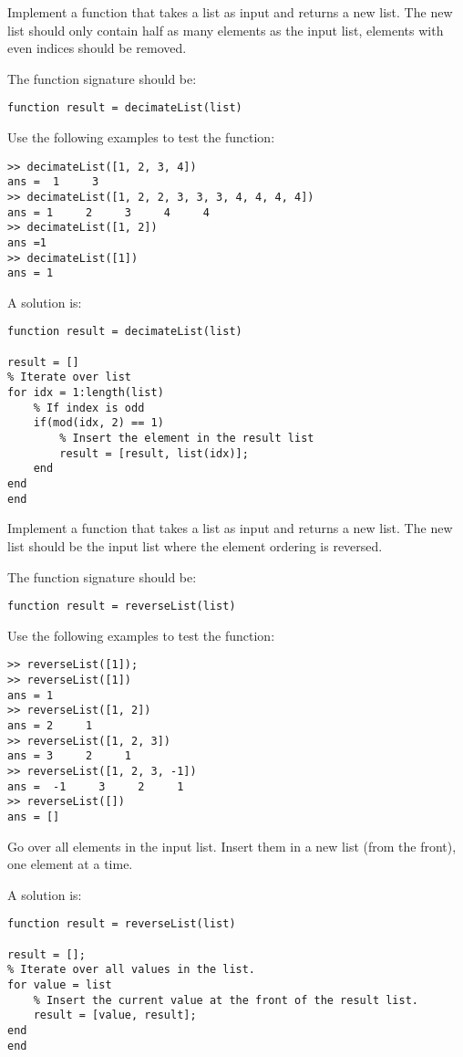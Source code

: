 \begin{ex}
Implement a function that takes a list as input and returns a new list.
The new list should only contain half as many elements as the input list, 
elements with even indices should be removed.

The function signature should be:
\begin{lstlisting}
function result = decimateList(list)
\end{lstlisting}
Use the following examples to test the function:
\begin{lstlisting}
>> decimateList([1, 2, 3, 4])
ans =  1     3
>> decimateList([1, 2, 2, 3, 3, 3, 4, 4, 4, 4])
ans = 1     2     3     4     4
>> decimateList([1, 2])
ans =1
>> decimateList([1])
ans = 1
\end{lstlisting}
\begin{hint}
\end{hint}
\begin{sol}
A solution is:
\begin{lstlisting}
function result = decimateList(list)

result = []
% Iterate over list
for idx = 1:length(list)
    % If index is odd
    if(mod(idx, 2) == 1)
        % Insert the element in the result list
        result = [result, list(idx)];
    end
end
end
\end{lstlisting}
\end{sol}
\end{ex}


\begin{ex}
Implement a function that takes a list as input and returns a new list.
The new list should be the input list where the element ordering is reversed.

The function signature should be:
\begin{lstlisting}
function result = reverseList(list)
\end{lstlisting}
Use the following examples to test the function:
\begin{lstlisting}
>> reverseList([1]);
>> reverseList([1])
ans = 1
>> reverseList([1, 2])
ans = 2     1
>> reverseList([1, 2, 3])
ans = 3     2     1
>> reverseList([1, 2, 3, -1])
ans =  -1     3     2     1
>> reverseList([])
ans = []
\end{lstlisting}
\begin{hint}
Go over all elements in the input list.
Insert them in a new list (from the front), one element at
a time.
\end{hint}
\begin{sol}
A solution is:
\begin{lstlisting}
function result = reverseList(list)

result = [];
% Iterate over all values in the list.
for value = list
    % Insert the current value at the front of the result list.
    result = [value, result];
end
end
\end{lstlisting}
\end{sol}
\end{ex}



